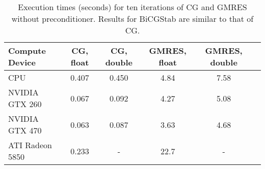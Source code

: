 \begin{table}[tb]
\begin{center}
\begin{tabular}{l|c| c|c| c|c|}
Compute Device & CG, float & CG, double & GMRES, float & GMRES, double \\
\hline
CPU             & 0.407 & 0.450 & 4.84 & 7.58 \\
NVIDIA GTX 260  & 0.067 & 0.092 & 4.27 & 5.08 \\
NVIDIA GTX 470  & 0.063 & 0.087 & 3.63 & 4.68 \\
ATI Radeon 5850 & 0.233 & -     & 22.7 & -\\
\end{tabular}
\caption{Execution times (seconds) for ten iterations of CG and GMRES without preconditioner. Results for BiCGStab are similar to that of CG.}
\label{tab:solverbench}
\end{center}
\end{table}

